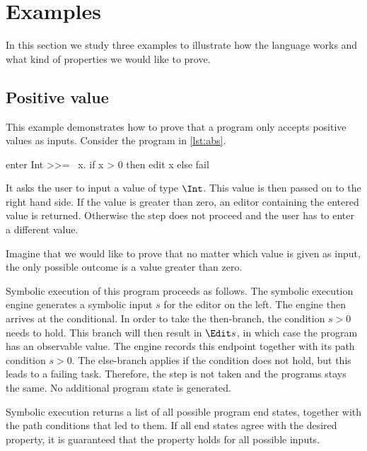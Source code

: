 
\section{Examples}
\label{sec:examples}

In this section we study three examples to illustrate how the language \TOPHAT works and what kind of properties we would like to prove.



\subsection{Positive value}

This example demonstrates how to prove that a program only accepts positive values as inputs.
Consider the program in \cref{lst:abs}.

\begin{TASK}[float=h
            ,caption=A task that only accepts positive values as inputs.
            ,label=lst:abs
            ]
  enter Int >>= \ x. if x > 0 then edit x else fail
\end{TASK}

It asks the user to input a value of type $\Int$.
This value is then passed on to the right hand side.
If the value is greater than zero, an editor containing the entered value is returned.
Otherwise the step does not proceed and the user has to enter a different value.

Imagine that we would like to prove that no matter which value is given as input,
the only possible outcome is a value greater than zero.

Symbolic execution of this program proceeds as follows.
The symbolic execution engine generates a symbolic input $s$ for the editor on the left.
The engine then arrives at the conditional.
In order to take the then-branch, the condition $s > 0$ needs to hold.
This branch will then result in $\Edit s$, in which case the program has an observable value.
The engine records this endpoint together with its path condition $s > 0$.
The else-branch applies if the condition does not hold, but this leads to a failing task.
Therefore, the step is not taken and the programs stays the same.
No additional program state is generated.

Symbolic execution returns a list of all possible program end states, together with the path conditions that led to them.
If all end states agree with the desired property, it is guaranteed that the property holds for all possible inputs.

